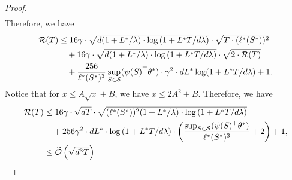 \begin{theorem}
\begin{proof}
\begin{align*}
\end{align*}
Therefore, we have
\begin{align*}
    {\mathcal{R}}(T) &\le 16\gamma \cdot \sqrt{d(1 + L^*/\lambda) \cdot \log\left(1 + L^*T/d\lambda\right)} \cdot \sqrt{T\cdot (\ell^*(S^*))^2 } \\
    &\quad + 16\gamma \cdot \sqrt{d(1 + L^*/\lambda) \cdot \log\left(1 + L^*T/d\lambda\right)} \cdot \sqrt{2 \cdot {\mathcal{R}}(T)} \\
    &\quad + \frac{256}{\ell^*(S^*)^3} \sup_{S \in {\mathcal{S}}} (\psi(S)^\top \theta^*) \cdot \gamma^2 \cdot dL^*\log(1 + L^*T/d\lambda) + 1.
\end{align*}
Notice that for $x \le A\sqrt{x} + B$, we have $x \le 2A^2 + B$. Therefore, we have
\begin{align*}
    {\mathcal{R}}(T) &\le 
    16\gamma \cdot \sqrt{dT}\cdot \sqrt{(\ell^*(S^*))^2(1 + L^*/\lambda) \cdot \log\left(1 + L^*T/d\lambda\right)} \\
    &\quad + 256\gamma^2 \cdot dL^* \cdot \log\left(1 + L^*T/d\lambda\right) \cdot \left(\frac{\sup_{S \in {\mathcal{S}}} (\psi(S)^\top \theta^*)}{\ell^*(S^*)^3} + 2\right) + 1, \\
    &\le \widetilde{{\mathcal{O}}}\left(\sqrt{d^3 T}\right)
\end{align*}



\end{proof}
\end{theorem}